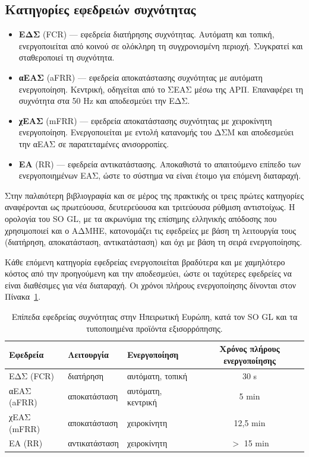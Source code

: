 \subsection{Κατηγορίες εφεδρειών συχνότητας}

\begin{itemize}
\item \textbf{ΕΔΣ} (FCR) --- εφεδρεία διατήρησης συχνότητας. Αυτόματη και τοπική,
      ενεργοποιείται από κοινού σε ολόκληρη τη συγχρονισμένη περιοχή. Συγκρατεί και
      σταθεροποιεί τη συχνότητα.
\item \textbf{αΕΑΣ} (aFRR) --- εφεδρεία αποκατάστασης συχνότητας με αυτόματη ενεργοποίηση.
      Κεντρική, οδηγείται από το ΣΕΑΣ μέσω της ΑΡΠ. Επαναφέρει τη συχνότητα στα 50 Hz και
      αποδεσμεύει την ΕΔΣ.
\item \textbf{χΕΑΣ} (mFRR) --- εφεδρεία αποκατάστασης συχνότητας με χειροκίνητη
      ενεργοποίηση. Ενεργοποιείται με εντολή κατανομής του ΔΣΜ και αποδεσμεύει την αΕΑΣ σε
      παρατεταμένες ανισορροπίες.
\item \textbf{ΕΑ} (RR) --- εφεδρεία αντικατάστασης. Αποκαθιστά το απαιτούμενο επίπεδο των
      ενεργοποιημένων ΕΑΣ, ώστε το σύστημα να είναι έτοιμο για επόμενη διαταραχή.
\end{itemize}

Στην παλαιότερη βιβλιογραφία και σε μέρος της πρακτικής οι τρεις πρώτες κατηγορίες
αναφέρονται ως πρωτεύουσα, δευτερεύουσα και τριτεύουσα ρύθμιση αντιστοίχως. Η ορολογία του
SO GL, με τα ακρωνύμια της επίσημης ελληνικής απόδοσης που χρησιμοποιεί και ο ΑΔΜΗΕ,
κατονομάζει τις εφεδρείες με βάση τη λειτουργία τους (διατήρηση, αποκατάσταση,
αντικατάσταση) και όχι με βάση τη σειρά ενεργοποίησης.

Κάθε επόμενη κατηγορία εφεδρείας ενεργοποιείται βραδύτερα και με χαμηλότερο κόστος από την
προηγούμενη και την αποδεσμεύει, ώστε οι ταχύτερες εφεδρείες να είναι διαθέσιμες για νέα
διαταραχή. Οι χρόνοι πλήρους ενεργοποίησης δίνονται στον Πίνακα~\ref{tab:reserves}.

\begin{table}[!htbp]
\centering
\begin{tabular}{lllc}
\hline
Εφεδρεία & Λειτουργία & Ενεργοποίηση & Χρόνος πλήρους ενεργοποίησης \\
\hline
ΕΔΣ (FCR)   & διατήρηση      & αυτόματη, τοπική   & 30 s \\
αΕΑΣ (aFRR) & αποκατάσταση   & αυτόματη, κεντρική & 5 min \\
χΕΑΣ (mFRR) & αποκατάσταση   & χειροκίνητη        & 12,5 min \\
ΕΑ (RR)     & αντικατάσταση  & χειροκίνητη        & $>$ 15 min \\
\hline
\end{tabular}
\caption{Επίπεδα εφεδρείας συχνότητας στην Ηπειρωτική Ευρώπη, κατά τον SO GL και τα
τυποποιημένα προϊόντα εξισορρόπησης.}
\label{tab:reserves}
\end{table}

